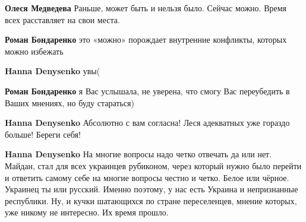 \begin{itemize}
\begin{itemize}
 
\textbf{Олеся Медведева} Раньше, может быть и нельзя было. Сейчас можно. Время всех расставляет на свои места.

 
\textbf{Роман Бондаренко} это «можно» порождает внутренние конфликты, которых можно избежать

 
\textbf{Hanna Denysenko} увы(

 
\textbf{Роман Бондаренко} я Вас услышала, не уверена, что смогу Вас переубедить в Ваших мнениях, но буду стараться)

 
\textbf{Hanna Denysenko} Абсолютно с вам согласна! Леся адекватных уже гораздо больше! Береги себя!

 
\textbf{Hanna Denysenko} На многие вопросы надо четко отвечать да или нет.
Майдан, стал для всех украинцев рубиконом, через который нужно было перейти и
ответить самому себе на многие вопросы честно и четко. Белое или чёрное.
Украинец ты или русский. Именно поэтому, у нас есть Украина и непризнанные
республики. Ну, и кучки шатающихся по стране переселенцев, мнение которых, уже
никому не интересно. Их время прошло.


\end{itemize}
\end{itemize}
